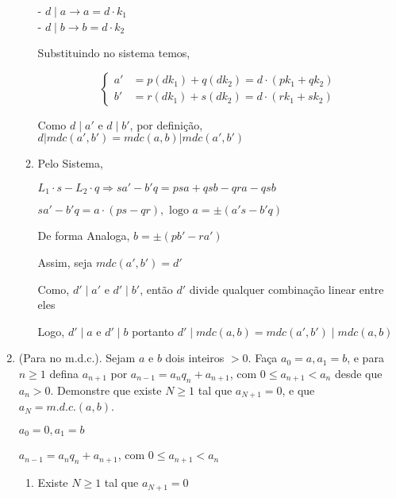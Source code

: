 \documentclass[a4paper,12pt]{article}
\begin{document}
\begin{enumerate}[label=3.\arabic*.]
\begin{enumerate}[label=\Roman*.]
        - $d \mid a \rightarrow a = d \cdot k_1 $ \\
        - $d \mid b \rightarrow b = d \cdot k_2 $
        
        Substituindo no sistema temos, 

        \begin{equation*}
            \left\{
                \begin{aligned}
                    a' &= p(dk_1) + q(dk_2) = d \cdot (pk_1 + qk_2) \\
                    b' &= r(dk_1) + s(dk_2) = d \cdot (rk_1 + sk_2)
                \end{aligned}
            \right.
        \end{equation*}

        Como $d \mid a' $ e $d \mid b' $, por definição, $d | mdc(a',b') = \boxed{mdc(a,b) | mdc(a',b')}$

        \item Pelo Sistema,
        
        $L_1 \cdot s - L_2 \cdot q \Rightarrow sa' - b'q = psa + qsb - qra - qsb$

        $ sa' - b'q = a \cdot (ps - qr), \text{ logo } a = \pm (a's - b'q)$

        De forma Analoga, 
        $b = \pm (pb' - ra')$

        Assim, seja $mdc(a',b') = d'$

        Como, $d' \mid a'$ e $d' \mid b'$, então $d'$ divide qualquer combinação linear entre eles

        Logo, $d' \mid a$ e $d' \mid b$ portanto $d' \mid mdc(a,b) = \boxed{mdc(a',b') \mid mdc(a,b)}$
    \end{enumerate}    

    \item (Para no m.d.c.). Sejam $a$ e $b$ dois inteiros $>0$. Faça $a_0 = a, a_1 = b$, e para $n \geq 1$ 
    defina $a_{n+1}$ por $a_{n-1} = a_n q_n + a_{n+1}$, com $0 \leq a_{n+1} < a_n$ desde que $a_n > 0$. 
    Demonstre que existe $N \geq 1$ tal que $a_{N+1} = 0$, e que $a_N = m.d.c.(a, b)$.

    $a_0 = 0, a_1 = b$

    $a_{n-1} = a_n q_n + a_{n+1}$, com $0 \leq a_{n+1} < a_n$

    \begin{enumerate}[label=\Roman*.]
        \item Existe $N \ge 1$ tal que $a_{N+1} = 0$
        

\end{enumerate}
\end{enumerate}
\end{document}
